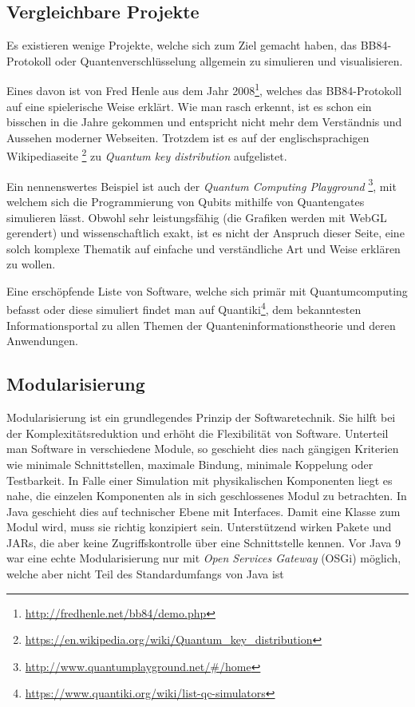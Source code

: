 \documentclass[a4paper,10.2pt,pdftex]{scrartcl}%
\begin{document}
\subsection{Vergleichbare Projekte}
Es existieren wenige Projekte, welche sich zum Ziel gemacht haben, das BB84-Protokoll oder Quantenverschlüsselung allgemein zu simulieren und visualisieren. 

Eines davon ist von Fred Henle aus dem Jahr 2008\footnote{\url{http://fredhenle.net/bb84/demo.php}}, welches das BB84-Protokoll auf eine spielerische Weise erklärt. Wie man rasch erkennt, ist es schon ein bisschen in die Jahre gekommen und entspricht nicht mehr dem Verständnis und Aussehen moderner Webseiten. Trotzdem ist es auf der englischsprachigen Wikipediaseite \footnote{\url{https://en.wikipedia.org/wiki/Quantum_key_distribution}} zu \emph{Quantum key distribution} aufgelistet.

Ein nennenswertes Beispiel ist auch der \emph{Quantum Computing Playground} \footnote{\url{http://www.quantumplayground.net/\#/home}}, mit welchem sich die Programmierung von Qubits mithilfe von Quantengates simulieren lässt. Obwohl sehr leistungsfähig (die Grafiken werden mit WebGL gerendert) und wissenschaftlich exakt, ist es nicht der Anspruch dieser Seite, eine solch komplexe Thematik auf einfache und verständliche Art und Weise erklären zu wollen.

Eine erschöpfende Liste von Software, welche sich primär mit Quantumcomputing befasst oder diese simuliert findet man auf Quantiki\footnote{\url{https://www.quantiki.org/wiki/list-qc-simulators}}, dem bekanntesten Informationsportal zu allen Themen der Quanteninformationstheorie und deren Anwendungen.

\subsection{Modularisierung}
Modularisierung ist ein grundlegendes Prinzip der Softwaretechnik. Sie hilft bei der Komplexitätsreduktion und erhöht die Flexibilität von Software. Unterteil man Software in verschiedene Module, so geschieht dies nach gängigen Kriterien wie minimale Schnittstellen, maximale Bindung, minimale Koppelung oder Testbarkeit. In Falle einer Simulation mit physikalischen Komponenten liegt es nahe, die einzelen Komponenten als in sich geschlossenes Modul zu betrachten. In Java geschieht dies auf technischer Ebene mit Interfaces. Damit eine Klasse zum Modul wird, muss sie richtig konzipiert sein. Unterstützend wirken Pakete und JARs, die aber keine Zugriffskontrolle über eine Schnittstelle kennen. Vor Java 9 war eine echte Modularisierung nur mit \emph{Open Services Gateway} (OSGi) möglich, welche aber nicht Teil des Standardumfangs von Java ist \cite[S. 32f]{modul}
\end{document}
